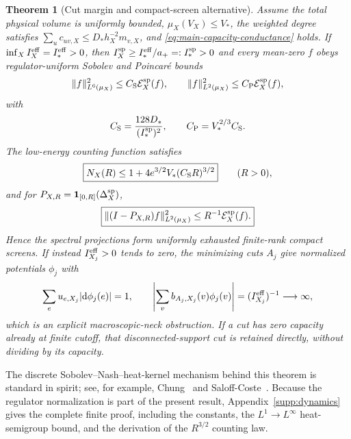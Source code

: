 \documentclass[11pt]{article}
\newtheorem{theorem}{Theorem}[section]
\theoremstyle{definition}
\theoremstyle{remark}
\newcommand{\one}{\mathbf 1}
\newcommand{\dd}{\mathrm d}
\begin{document}
\begin{theorem}[Cut margin and compact-screen alternative]
\label{thm:main-spatial-screen}
Assume the total physical volume is uniformly bounded,
$\mu_X(V_X)\le V_*$, the weighted degree satisfies
$\sum_uc_{uv,X}\le D_*h_X^{-2}m_{v,X}$, and
\eqref{eq:main-capacity-conductance} holds.  If
$\inf_X I_X^{\rm eff}=I_*^{\rm eff}>0$, then
$I_X^{\rm sp}\ge I_*^{\rm eff}/a_+=:I_*^{\rm sp}>0$ and every mean-zero $f$
obeys regulator-uniform Sobolev and Poincar\'e bounds
\begin{equation}
 \|f\|_{L^6(\mu_X)}^2\le C_{\rm S}\mathcal E_X^{\rm sp}(f),
 \qquad
 \|f\|_{L^2(\mu_X)}^2\le C_{\rm P}\mathcal E_X^{\rm sp}(f),
 \label{eq:main-sobolev-poincare}
\end{equation}
with
\begin{equation}
 C_{\rm S}=\frac{128D_*}{(I_*^{\rm sp})^2},
 \qquad
 C_{\rm P}=V_*^{2/3}C_{\rm S}.
 \label{eq:main-sobolev-constants}
\end{equation}
The low-energy counting function satisfies
\begin{equation}
 \boxed{
 N_X(R)\le1+4e^{3/2}V_*(C_{\rm S}R)^{3/2}}
 \qquad(R>0),
 \label{eq:main-weyl-count}
\end{equation}
and for $P_{X,R}=\one_{[0,R]}(\Delta_X^{\rm sp})$,
\begin{equation}
 \boxed{
 \|(I-P_{X,R})f\|_{L^2(\mu_X)}^2
 \le R^{-1}\mathcal E_X^{\rm sp}(f).}
 \label{eq:main-screen-tail}
\end{equation}
Hence the spectral projections form uniformly exhausted finite-rank compact
screens.  If instead $I_{X_j}^{\rm eff}>0$ tends to zero, the minimizing
cuts $A_j$ give normalized potentials $\phi_j$ with
\begin{equation}
 \sum_eu_{e,X_j}|\dd\phi_j(e)|=1,
 \qquad
 \left|\sum_v b_{A_j,X_j}(v)\phi_j(v)\right|
 =(I_{X_j}^{\rm eff})^{-1}\longrightarrow\infty,
 \label{eq:main-neck-obstruction}
\end{equation}
which is an explicit macroscopic-neck obstruction.  If a cut has zero
capacity already at finite cutoff, that disconnected-support cut is retained
directly, without dividing by its capacity.
\end{theorem}

The discrete Sobolev--Nash--heat-kernel mechanism behind this theorem is
standard in spirit; see, for example, Chung~\cite[Chs.~10--11]{Chung1997} and
Saloff-Coste~\cite{SaloffCoste2002}.  Because the regulator normalization is
part of the present result, Appendix~\ref{supp:dynamics} gives the complete
finite proof, including the constants, the $L^1\!\to L^\infty$ heat-semigroup
bound, and the derivation of the $R^{3/2}$ counting law.
\end{document}
